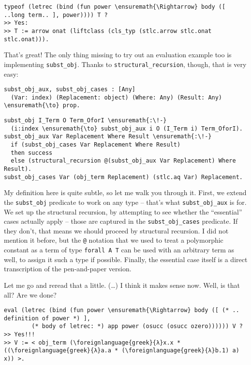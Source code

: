 \begin{verbatim}
typeof (letrec (bind (fun power \ensuremath{\Rightarrow} body ([ ..long term.. ], power)))) T ?
>> Yes:
>> T := arrow onat (liftclass (cls_typ (stlc.arrow stlc.onat stlc.onat))).
\end{verbatim}

\heroADVISOR{} That's great! The only thing missing to try out an evaluation
example too is implementing \texttt{subst\_obj}. Thanks to
\texttt{structural\_recursion}, though, that is very easy:

\begin{verbatim}
subst_obj_aux, subst_obj_cases : [Any]
  (Var: index) (Replacement: object) (Where: Any) (Result: Any) \ensuremath{\to} prop.
\end{verbatim}

\begin{verbatim}
subst_obj I_Term O Term_OforI \ensuremath{:\!-}
  (i:index \ensuremath{\to} subst_obj_aux i O (I_Term i) Term_OforI).
subst_obj_aux Var Replacement Where Result \ensuremath{:\!-}
  if (subst_obj_cases Var Replacement Where Result)
  then success
  else (structural_recursion @(subst_obj_aux Var Replacement) Where Result).
subst_obj_cases Var (obj_term Replacement) (stlc.aq Var) Replacement.
\end{verbatim}

\noindent
My definition here is quite subtle, so let me walk you through it.
First, we extend the \texttt{subst\_obj} predicate to work on any type
-- that's what \texttt{subst\_obj\_aux} is for. We set up the structural
recursion, by attempting to see whether the ``essential'' cases actually
apply -- those are captured in the \texttt{subst\_obj\_cases} predicate.
If they don't, that means we should proceed by structural recursion. I
did not mention it before, but the \texttt{@} notation that we used to
treat a polymorphic constant as a term of type \texttt{forall\ A\ T} can
be used with an arbitrary term as well, to assign it such a type if
possible. Finally, the essential case itself is a direct transcription
of the pen-and-paper version.

\heroSTUDENT{} Let me go and reread that a little. (\ldots{}) I think it makes
sense now. Well, is that all? Are we done?

\begin{verbatim}
eval (letrec (bind (fun power \ensuremath{\Rightarrow} body ([ (* .. definition of power *) ],
        (* body of letrec: *) app power (osucc (osucc ozero)))))) V ?
>> Yes!!!
>> V := < obj_term (\foreignlanguage{greek}{λ}x.x * ((\foreignlanguage{greek}{λ}a.a * (\foreignlanguage{greek}{λ}b.1) a) x)) >.
\end{verbatim}

